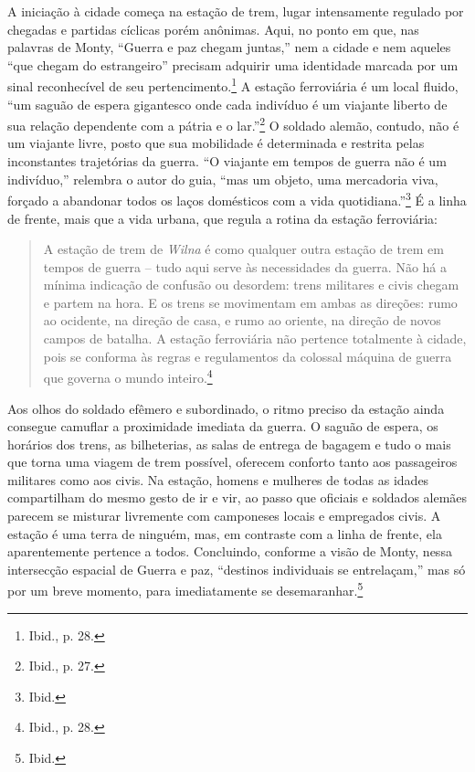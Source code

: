 \asterisc

A iniciação à cidade começa na estação de trem, lugar intensamente
regulado por chegadas e partidas cíclicas porém anônimas. Aqui, no ponto
em que, nas palavras de Monty, ``Guerra e paz chegam juntas,'' nem a
cidade e nem aqueles ``que chegam do estrangeiro'' precisam adquirir uma
identidade marcada por um sinal reconhecível de seu
pertencimento.\footnote{Ibid., p. 28.} A estação ferroviária é um local
fluido, ``um saguão de espera gigantesco onde cada indivíduo é um
viajante liberto de sua relação dependente com a pátria e o
lar.''\footnote{Ibid., p. 27.} O soldado alemão, contudo, não é um
viajante livre, posto que sua mobilidade é determinada e restrita pelas
inconstantes trajetórias da guerra. ``O viajante em tempos de guerra não
é um indivíduo,'' relembra o autor do guia, ``mas um objeto, uma
mercadoria viva, forçado a abandonar todos os laços domésticos com a
vida quotidiana.''\footnote{Ibid.} É a linha de frente, mais que a vida
urbana, que regula a rotina da estação ferroviária:

\begin{quote}
A estação de trem de \textit{Wilna} é como qualquer outra estação de trem em
tempos de guerra -- tudo aqui serve às necessidades da guerra. Não há a
mínima indicação de confusão ou desordem: trens militares e civis chegam
e partem na hora. E os trens se movimentam em ambas as direções: rumo ao
ocidente, na direção de casa, e rumo ao oriente, na direção de novos
campos de batalha. A estação ferroviária não pertence totalmente à
cidade, pois se conforma às regras e regulamentos da colossal máquina de
guerra que governa o mundo inteiro.\footnote{Ibid., p. 28.}
\end{quote}

Aos olhos do soldado efêmero e subordinado, o ritmo preciso da estação
ainda consegue camuflar a proximidade imediata da guerra. O saguão de
espera, os horários dos trens, as bilheterias, as salas de entrega de
bagagem e tudo o mais que torna uma viagem de trem possível, oferecem
conforto tanto aos passageiros militares como aos civis. Na estação,
homens e mulheres de todas as idades compartilham do mesmo gesto de ir e
vir, ao passo que oficiais e soldados alemães parecem se misturar
livremente com camponeses locais e empregados civis. A estação é uma
terra de ninguém, mas, em contraste com a linha de frente, ela
aparentemente pertence a todos. Concluindo, conforme a visão de Monty,
nessa intersecção espacial de Guerra e paz, ``destinos individuais se
entrelaçam,'' mas só por um breve momento, para imediatamente se
desemaranhar.\footnote{Ibid.}

